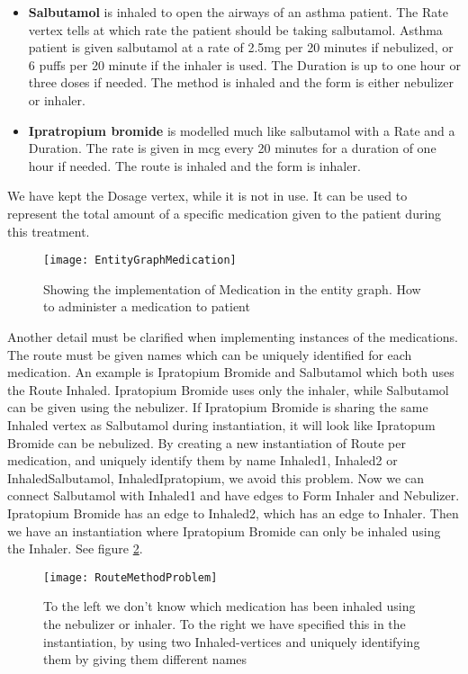 \begin{itemize}
	\item \textbf{Salbutamol} is inhaled to open the airways of an asthma patient. The Rate vertex tells at which rate the patient should be taking salbutamol. Asthma patient is given salbutamol at a rate of 2.5mg per 20 minutes if nebulized, or 6 puffs per 20 minute if the inhaler is used. The Duration is up to one hour or three doses if needed. The method is inhaled and the form is either nebulizer or inhaler.
	
	\item \textbf{Ipratropium bromide} is modelled much like salbutamol with a Rate and a Duration. The rate is given in mcg every 20 minutes for a duration of one hour if needed. The route is inhaled and the form is inhaler.
\end{itemize}

 We have kept the Dosage vertex, while it is not in use. It can be used to represent the total amount of a specific medication given to the patient during this treatment.
 

\begin{figure}[h!]
	\label{fig:EntityGraphMedication}
	\texttt{[image: EntityGraphMedication]}
	\caption {Showing the implementation of Medication in the entity graph. How to administer a medication to patient}
\end{figure}

 Another detail must be clarified when implementing instances of the medications. The route must be given names which can be uniquely identified for each medication. An example is Ipratopium Bromide and Salbutamol which both uses the Route Inhaled. Ipratopium Bromide uses only the inhaler, while Salbutamol can be given using the nebulizer. If Ipratopium Bromide is sharing the same Inhaled vertex as Salbutamol during instantiation, it will look like Ipratopum Bromide can be nebulized. By creating a new instantiation of Route per medication, and uniquely identify them by name Inhaled1, Inhaled2 or InhaledSalbutamol, InhaledIpratopium, we avoid this problem. Now we can connect Salbutamol with Inhaled1 and have edges to Form Inhaler and Nebulizer. Ipratopium Bromide has an edge to Inhaled2, which has an edge to Inhaler. Then we have an instantiation where Ipratopium Bromide can only be inhaled using the Inhaler. See figure \ref{fig:RouteMethodProblem}.


\begin{figure}[h!]
	\label{fig:RouteMethodProblem}
	\texttt{[image: RouteMethodProblem]}
	\caption {To the left we don't know which medication has been inhaled using the nebulizer or inhaler. To the right we have specified this in the instantiation, by using two Inhaled-vertices and uniquely identifying them by giving them different names}
\end{figure}


